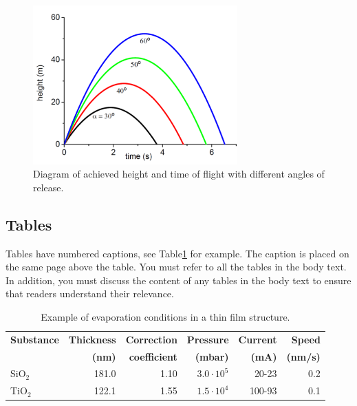 
\begin{figure}[t]
  \begin{center}
    \includegraphics[width=0.7\textwidth]{figure}
  \end{center}
  \caption{Diagram of achieved height and time of flight with different angles of release.}
  \label{fig:ex_fig}
\end{figure}


\subsection{Tables}

Tables have numbered captions, see Table\ref{tab:thin_film} for
example. The caption is placed on the same page above the table. You 
must refer to all the tables in the body text. In addition, you must 
discuss the content of any tables in the body text to ensure that readers 
understand their relevance.

\begin{table}[ht]
  \small
  \begin{center}
    \caption{Example of evaporation conditions in a thin film structure.}
    \label{tab:thin_film}
    \begin{tabular}{l | r r r r r}
      \hline
      \textbf{Substance} & \textbf{Thickness}& \textbf{Correction } & \textbf{Pressure}  & \textbf{Current} & \textbf{Speed} \\
                         & \textbf{(nm)}     & \textbf{coefficient} & \textbf{(mbar)}    & \textbf{(mA)}    & \textbf{(nm/s)} \\
      \hline 
      SiO$_2$	& 181.0	& 1.10	& $3.0\cdot10^5$	& 20-23	 &0.2 \\
      TiO$_2$	& 122.1	& 1.55	& $1.5\cdot10^4$	& 100-93 &0.1 \\
      \hline
    \end{tabular}
  \end{center}
\end{table}



